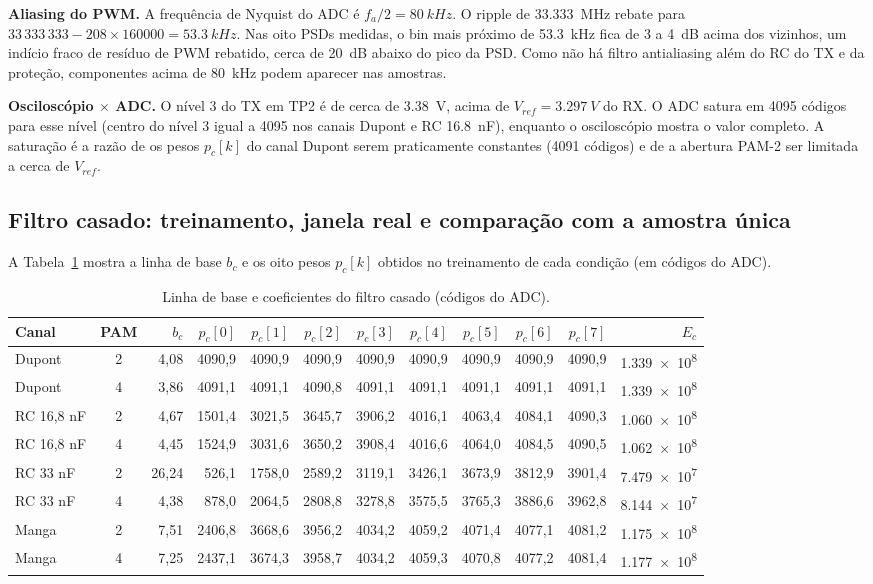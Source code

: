\documentclass[12pt,a4paper]{article}
\begin{document}
\textbf{Aliasing do PWM.} A frequência de Nyquist do ADC é $f_a/2 = \SI{80}{kHz}$. O ripple de
\SI{33,333}{MHz} rebate para $33\,333\,333 - 208\times\num{160000} = \SI{53,3}{kHz}$. Nas oito PSDs
medidas, o bin mais próximo de \SI{53,3}{kHz} fica de 3 a \SI{4}{dB} acima dos vizinhos, um indício
fraco de resíduo de PWM rebatido, cerca de \SI{20}{dB} abaixo do pico da PSD. Como não há filtro
antialiasing além do RC do TX e da proteção, componentes acima de \SI{80}{kHz} podem aparecer nas
amostras.

\textbf{Osciloscópio $\times$ ADC.} O nível 3 do TX em TP2 é de cerca de \SI{3,38}{V}, acima de
$V_{ref} = \SI{3,297}{V}$ do RX. O ADC satura em \num{4095} códigos para esse nível (centro do nível 3
igual a \num{4095} nos canais Dupont e RC \SI{16,8}{nF}), enquanto o osciloscópio mostra o valor
completo. A saturação é a razão de os pesos $p_c[k]$ do canal Dupont serem praticamente constantes
(\num{4091} códigos) e de a abertura PAM-2 ser limitada a cerca de $V_{ref}$.

\subsection{Filtro casado: treinamento, janela real e comparação com a amostra única}

A Tabela~\ref{tab:pc} mostra a linha de base $b_c$ e os oito pesos $p_c[k]$ obtidos no treinamento
de cada condição (em códigos do ADC).

\begin{table}[H]
\centering
\caption{Linha de base e coeficientes do filtro casado (códigos do ADC).}
\label{tab:pc}
\footnotesize
\setlength{\tabcolsep}{3.5pt}
\begin{tabular}{l c r r r r r r r r r r}
\toprule
Canal & PAM & $b_c$ & $p_c[0]$ & $p_c[1]$ & $p_c[2]$ & $p_c[3]$ & $p_c[4]$ & $p_c[5]$ & $p_c[6]$ & $p_c[7]$ & $E_c$ \\
\midrule
Dupont & 2 & 4,08 & 4090,9 & 4090,9 & 4090,9 & 4090,9 & 4090,9 & 4090,9 & 4090,9 & 4090,9 & \num{1.339e8} \\
Dupont & 4 & 3,86 & 4091,1 & 4091,1 & 4090,8 & 4091,1 & 4091,1 & 4091,1 & 4091,1 & 4091,1 & \num{1.339e8} \\
RC 16,8 nF & 2 & 4,67 & 1501,4 & 3021,5 & 3645,7 & 3906,2 & 4016,1 & 4063,4 & 4084,1 & 4090,3 & \num{1.060e8} \\
RC 16,8 nF & 4 & 4,45 & 1524,9 & 3031,6 & 3650,2 & 3908,4 & 4016,6 & 4064,0 & 4084,5 & 4090,5 & \num{1.062e8} \\
RC 33 nF & 2 & 26,24 & 526,1 & 1758,0 & 2589,2 & 3119,1 & 3426,1 & 3673,9 & 3812,9 & 3901,4 & \num{7.479e7} \\
RC 33 nF & 4 & 4,38 & 878,0 & 2064,5 & 2808,8 & 3278,8 & 3575,5 & 3765,3 & 3886,6 & 3962,8 & \num{8.144e7} \\
Manga & 2 & 7,51 & 2406,8 & 3668,6 & 3956,2 & 4034,2 & 4059,2 & 4071,4 & 4077,1 & 4081,2 & \num{1.175e8} \\
Manga & 4 & 7,25 & 2437,1 & 3674,3 & 3958,7 & 4034,2 & 4059,3 & 4070,8 & 4077,2 & 4081,4 & \num{1.177e8} \\
\bottomrule
\end{tabular}
\end{table}
\end{document}
